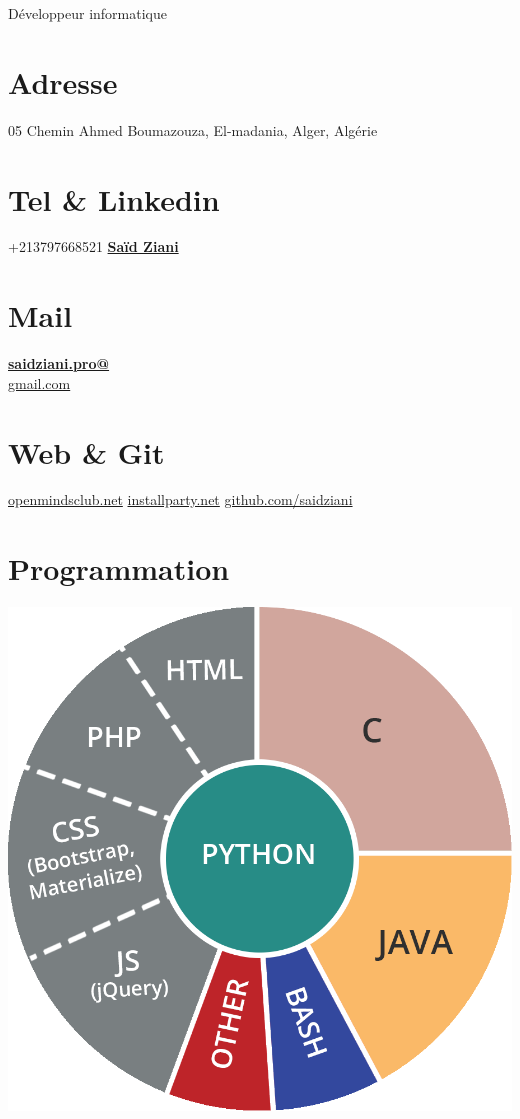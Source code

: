 \documentclass[]{friggeri-cv}
\begin{document}
      {Développeur informatique}
      

\begin{aside}
  \section{Adresse}
    05 Chemin Ahmed Boumazouza,
    El-madania, Alger, Algérie
    ~
  \section{Tel \& Linkedin}
    +213797668521
    \href{https://www.linkedin.com/in/sa%C3%AFd-ziani-008487120/}{\textbf{Saïd Ziani}}
    ~
  \section{Mail}
    \href{mailto:saidziani.pro@gmail.com}{\textbf{saidziani.pro@}\\gmail.com}
    ~
  \section{Web \& Git}
    \href{http://www.openmindsclub.net}{openmindsclub.net}
    \href{http://www.openmindsclub.net/ip8}{installparty.net}
    \href{https://github.com/saidziani}{github.com/saidziani}
    ~
  \section{Programmation}
    \includegraphics[scale=0.1]{img/programmation.png}
    ~

\end{aside}
\end{document}
